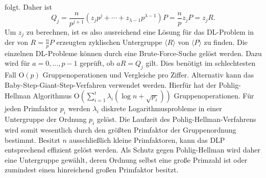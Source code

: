 folgt. Daher ist
\[
    Q_j=\frac{n}{p^{j+1}}(z_j p^j+ \cdots +z_{\lambda-1}p^{\lambda-1})P=\frac{n}{p}z_j P=z_j R.
\]
Um $z_j$ zu berechnen, ist es also ausreichend eine Lösung für das DL-Problem in der von $R=\frac{n}{p}P$ erzeugten zyklischen Untergruppe \(\langle R\rangle\) von \(\langle P \rangle\) zu finden. Die einzelnen DL-Probleme können durch eine Brute-Force-Suche gelöst werden. Dazu wird für $a=0,\dots,p-1$ geprüft, ob $aR=Q_j$ gilt. Dies benötigt im schlechtesten Fall
$\mathrm{O}(p)$ Gruppenoperationen und Vergleiche pro Ziffer. Alternativ kann das Baby-Step-Giant-Step-Verfahren verwendet werden. Hierfür hat der Pohlig-Hellman Algorithmus \(\mathrm{O}\left(\sum_{i=1}^{t}\lambda_i \left(\log n+\sqrt{p_i}\right)\right)\) Gruppenoperationen. Für jeden Primfaktor $p_i$ werden $\lambda_i$ diskrete Logarithmusprobleme in einer Untergruppe der Ordnung $p_i$ gelöst. Die Laufzeit des Pohlig-Hellman-Verfahrens wird somit wesentlich durch den größten Primfaktor der Gruppenordnung bestimmt. Besitzt $n$ ausschließlich kleine Primfaktoren, kann das DLP entsprechend effizient gelöst werden. Als Schutz gegen Pohlig-Hellman wird daher eine Untergruppe gewählt, deren Ordnung selbst eine große Primzahl ist oder zumindest einen hinreichend großen Primfaktor besitzt.